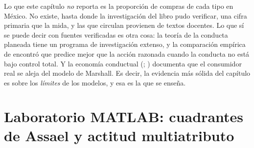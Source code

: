 Lo que este capítulo \emph{no} reporta es la proporción de compras de cada tipo
en México. No existe, hasta donde la investigación del libro pudo verificar, una
cifra primaria que la mida, y las que circulan provienen de textos
docentes. Lo que sí se puede decir con fuentes verificadas es otra cosa:
la teoría de la conducta planeada tiene un programa de investigación
extenso, y la comparación empírica de \textcite{madden1992} encontró que
predice mejor que la acción razonada cuando la conducta no está bajo control
total. Y la economía conductual (\textcite{simon1955};
\textcite{tverskykahneman1974}) documenta que el consumidor real se aleja del
modelo de Marshall. Es decir, la evidencia más sólida del capítulo es sobre
los \emph{límites} de los modelos, y esa es la que se enseña.

\section{Laboratorio MATLAB: cuadrantes de Assael y actitud multiatributo}
\label{sec:cap09-lab}

